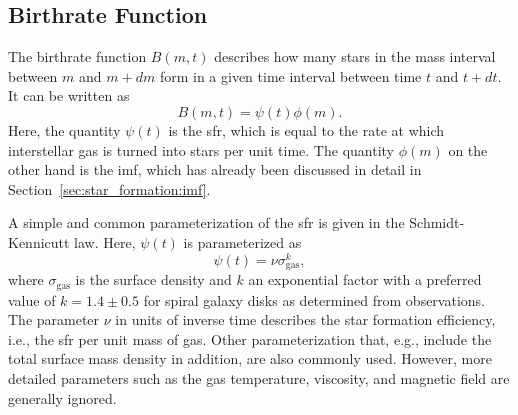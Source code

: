 \subsection{Birthrate Function}

The birthrate function $B(m,t)$ describes how many stars in the mass interval between $m$ and $m+dm$ form in a given time interval between time $t$ and $t+dt$. It can be written as
\begin{equation}
    B(m,t) = \psi(t) \phi(m).
\end{equation}
Here, the quantity $\psi(t)$ is the \acf{sfr}, which is equal to the rate at which interstellar gas is turned into stars per unit time. The quantity $\phi(m)$ on the other hand is the \acf{imf}, which has already been discussed in detail in Section~\ref{sec:star_formation:imf}. 

A simple and common parameterization of the \ac{sfr} is given in the Schmidt-Kennicutt law. Here, $\psi(t)$ is parameterized as
\begin{equation}
    \psi(t) = \nu \sigma_\mathrm{gas}^k, \label{eqn:gce:schmidt_kennicutt_law}
\end{equation}
where $\sigma_\mathrm{gas}$ is the surface density and $k$ an exponential factor with a preferred value of $k=1.4\pm0.5$ for spiral galaxy disks as determined from observations. The parameter $\nu$ in units of inverse time describes the star formation efficiency, i.e., the \ac{sfr} per unit mass of gas. Other parameterization that, e.g., include the total surface mass density in addition, are also commonly used. However, more detailed parameters such as the gas temperature, viscosity, and magnetic field are generally ignored.

